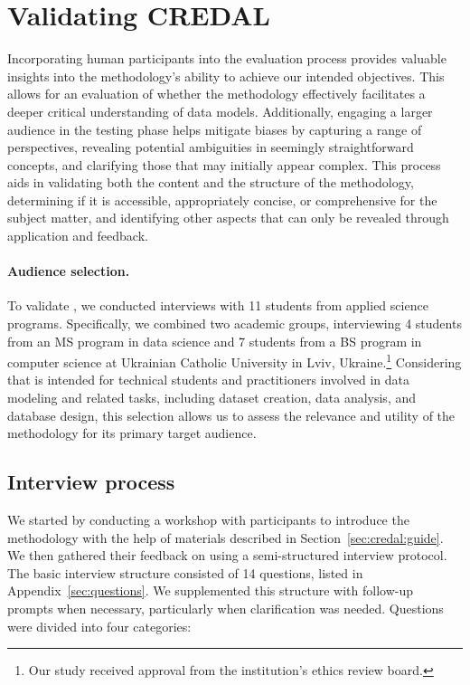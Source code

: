 \section{Validating CREDAL}
\label{sec:eval}

Incorporating human participants into the evaluation process provides valuable insights into the methodology's ability to achieve our intended objectives. This allows for an evaluation of whether the methodology effectively facilitates a deeper critical understanding of data models. Additionally, engaging a larger audience in the testing phase helps mitigate biases by capturing a range of perspectives, revealing potential ambiguities in seemingly straightforward concepts, and clarifying those that may initially appear complex. This process aids in validating both the content and the structure of the methodology, determining if it is accessible, appropriately concise, or comprehensive for the subject matter, and identifying other aspects that can only be revealed through application and feedback.

\paragraph{Audience selection.} To validate \credal, we conducted interviews with 11 students from applied science programs. Specifically, we combined two academic groups, interviewing 4 students from an MS program in data science and 7 students from a BS program in computer science at Ukrainian Catholic University in Lviv, Ukraine.\footnote{Our study received approval from the institution's ethics review board.}  Considering that \credal is intended for technical students and practitioners involved in data modeling and related tasks, including dataset creation, data analysis, and database design, this selection allows us to assess the relevance and utility of the methodology for its primary target audience.

\subsection{Interview process}
\label{sec:eval:process}

We started by conducting a workshop with participants to introduce the \credal methodology with the help of materials described in Section~\ref{sec:credal:guide}.  We then gathered their feedback on \credal using a semi-structured interview protocol.  The basic interview structure consisted of 14 questions, listed in Appendix~\ref{sec:questions}.  We supplemented this structure with follow-up prompts when necessary, particularly when clarification was needed.  Questions were divided into four categories:

